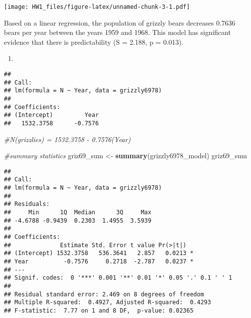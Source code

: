 \documentclass[]{article}
\newenvironment{Shaded}{\begin{snugshade}}{\end{snugshade}}
\newcommand{\KeywordTok}[1]{\textcolor[rgb]{0.13,0.29,0.53}{\textbf{#1}}}
\newcommand{\DataTypeTok}[1]{\textcolor[rgb]{0.13,0.29,0.53}{#1}}
\newcommand{\StringTok}[1]{\textcolor[rgb]{0.31,0.60,0.02}{#1}}
\newcommand{\CommentTok}[1]{\textcolor[rgb]{0.56,0.35,0.01}{\textit{#1}}}
\newcommand{\OperatorTok}[1]{\textcolor[rgb]{0.81,0.36,0.00}{\textbf{#1}}}
\newcommand{\NormalTok}[1]{#1}
\begin{document}
\texttt{[image: HW1\_files/figure-latex/unnamed-chunk-3-1.pdf]}

Based on a linear regression, the population of grizzly bears decreases
0.7636 bears per year between the years 1959 and 1968. This model has
significant evidence that there is predictability (S = 2.188, p =
0.013).

\begin{enumerate}
\def\labelenumi{\arabic{enumi}.}
\setcounter{enumi}{6}
\item
\end{enumerate}

\begin{Shaded}
\end{Shaded}

\begin{verbatim}
## 
## Call:
## lm(formula = N ~ Year, data = grizzly6978)
## 
## Coefficients:
## (Intercept)         Year  
##   1532.3758      -0.7576
\end{verbatim}

\begin{Shaded}
\begin{Highlighting}[]
\CommentTok{#N(grizzlies) = 1532.3758 - 0.7576(Year)}

\CommentTok{#summary statistics}
\NormalTok{griz69_sum <-}\StringTok{ }\KeywordTok{summary}\NormalTok{(grizzly6978_model)}
\NormalTok{griz69_sum}
\end{Highlighting}
\end{Shaded}

\begin{verbatim}
## 
## Call:
## lm(formula = N ~ Year, data = grizzly6978)
## 
## Residuals:
##     Min      1Q  Median      3Q     Max 
## -4.6788 -0.9439  0.2303  1.4955  3.5939 
## 
## Coefficients:
##              Estimate Std. Error t value Pr(>|t|)  
## (Intercept) 1532.3758   536.3641   2.857   0.0213 *
## Year          -0.7576     0.2718  -2.787   0.0237 *
## ---
## Signif. codes:  0 '***' 0.001 '**' 0.01 '*' 0.05 '.' 0.1 ' ' 1
## 
## Residual standard error: 2.469 on 8 degrees of freedom
## Multiple R-squared:  0.4927, Adjusted R-squared:  0.4293 
## F-statistic:  7.77 on 1 and 8 DF,  p-value: 0.02365
\end{verbatim}
\end{document}
